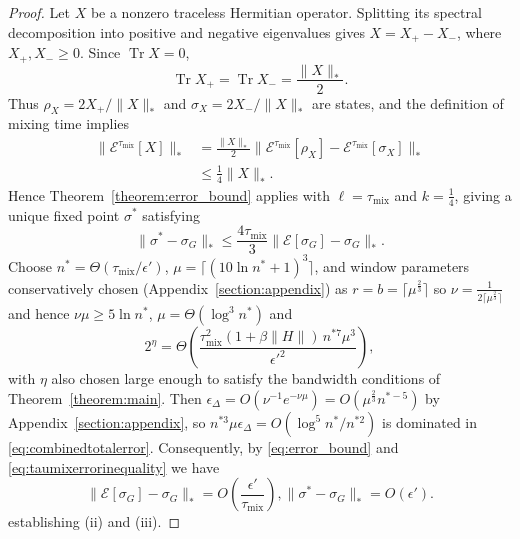 \documentclass[aps,floatfix,10pt,amssymb,amsfont,amsmath,superscriptaddress,float,nofootinbib,longbibliography,nobalancelastpage,twocolumn]{revtex4-2}
\begin{document}
\begin{proof}
Let $X$ be a nonzero traceless Hermitian operator. Splitting its spectral decomposition into positive and negative eigenvalues gives $X=X_+-X_-$, where $X_+,X_-\geq0$. Since $\operatorname{Tr}X=0$,
\begin{equation}
    \operatorname{Tr}X_+
    =\operatorname{Tr}X_-
    =\frac{\|X\|_*}{2}.
\end{equation}
Thus $\rho_X=2X_+/\|X\|_*$ and $\sigma_X=2X_-/\|X\|_*$ are states, and the definition of mixing time implies
\begin{equation}
\begin{aligned}
    \|\mathcal{E}^{\tau_{\mathrm{mix}}}[X]\|_*
    &=\frac{\|X\|_*}{2}
      \|\mathcal{E}^{\tau_{\mathrm{mix}}}[\rho_X]
       -\mathcal{E}^{\tau_{\mathrm{mix}}}[\sigma_X]\|_*\\
    &\leq \frac14\|X\|_*.
\end{aligned}
\label{eq:Xcontracting}
\end{equation}
Hence Theorem~\ref{theorem:error_bound} applies with $\ell=\tau_{\mathrm{mix}}$ and $k=\tfrac14$, giving a unique fixed point $\sigma^*$ satisfying
\begin{equation}
    \|\sigma^*-\sigma_G\|_*
    \leq \frac{4\tau_{\mathrm{mix}}}{3}
      \|\mathcal{E}[\sigma_G]-\sigma_G\|_*.
      \label{eq:taumixerrorinequality}
\end{equation}
Choose $n^*=\Theta(\tau_{\mathrm{mix}}/\epsilon')$, $\mu=\lceil(10\ln n^*+1)^3\rceil$, and window parameters conservatively chosen (Appendix~\ref{section:appendix}) as $r=b=\lceil\mu^{\frac{2}{3}}\rceil$ so $\nu = \frac{1}{2\lceil\mu^{\frac{2}{3}}\rceil}$ and hence $\nu\mu\geq 5\ln n^*$, $\mu=\Theta(\log^3 n^*)$ and
\begin{equation}
    2^\eta = \Theta\left(\frac{\tau_{\mathrm{mix}}^2(1+\beta\|H\|)\,
            n^{*7}\mu^3}{\epsilon'^2}\right),
\end{equation}
with $\eta$ also chosen large enough to satisfy the bandwidth conditions of Theorem~\ref{theorem:main}. Then $\epsilon_\Delta=O(\nu^{-1}e^{-\nu\mu})=O(\mu^{\frac{2}{3}}n^{*-5})$ by Appendix~\ref{section:appendix}, so $n^{*3}\mu\epsilon_\Delta=O(\log^5 n^*/n^{*2})$ is dominated in \eqref{eq:combinedtotalerror}. Consequently, by \eqref{eq:error_bound} and \eqref{eq:taumixerrorinequality} we have
\begin{equation}
    \|\mathcal{E}[\sigma_G]-\sigma_G\|_* = O\left(\frac{\epsilon'}{\tau_{\mathrm{mix}}}\right),
    \|\sigma^*-\sigma_G\|_*= O\left(\epsilon'\right).
\end{equation}
establishing (ii) and (iii).


\end{proof}
\end{document}
